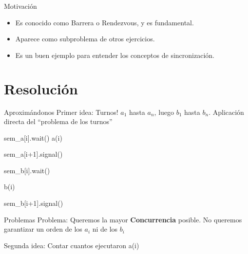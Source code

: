 \documentclass[pdf]{beamer}
\newcommand{\quotes}[1]{``#1''}
\begin{document}
\begin{frame}{Motivación}
    \begin{itemize}
        \item Es conocido como Barrera o Rendezvous, y es fundamental.
        \vspace{1em}
        \item Aparece como subproblema de otros ejercicios.
        \vspace{1em}
        \item Es un buen ejemplo para entender los conceptos de sincronización. 
    \end{itemize}
\end{frame}

\section{Resolución}
\begin{frame}{Aproximándonos}
    Primer idea: \pause Turnos! 
    \pause 
    \newline $a_1$ hasta $a_n$, luego $b_1$ hasta $b_n$.
    Aplicación directa del \quotes{problema de los turnos}
    
    \vspace{2em}
    
    \pause
    \begin{algorithmic}
    
         
            \State sem\_a[i].wait()
            \vspace{1em}
            \State a(i)
            \vspace{1em}
            
            \State sem\_a[i+1].signal()
            \vspace{1em}
            
            \State sem\_b[i].wait()
            \vspace{1em}
            
            \State b(i)
            \vspace{1em}
            
            \State sem\_b[i+1].signal()
        
        \EndFunction
        
    \end{algorithmic}
    
    \pause
\end{frame}

\begin{frame}{Problemas}
    Problema: Queremos la mayor \textbf{Concurrencia} posible. 
    No queremos garantizar un orden de los $a_i$ ni de los $b_i$ 
    
    \vspace{2em}
    
    \pause
    
    Segunda idea: Contar cuantos ejecutaron a(i)
\end{frame}
\end{document}
